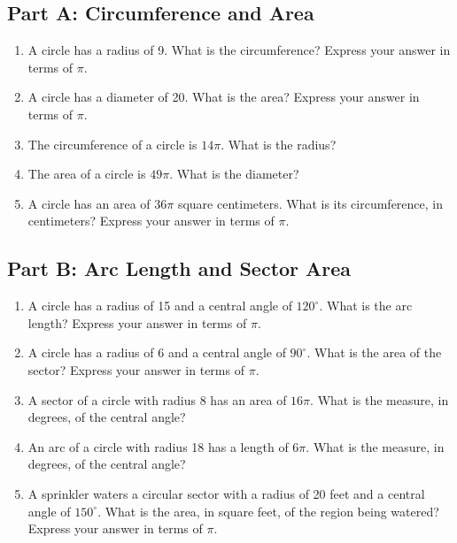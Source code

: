 \documentclass[14pt]{extarticle}
\begin{document}
\subsection*{Part A: Circumference and Area}
\begin{enumerate}
  \item A circle has a radius of 9. What is the circumference? Express your answer in terms of \(\pi\).
  \item A circle has a diameter of 20. What is the area? Express your answer in terms of \(\pi\).
  \item The circumference of a circle is \(14\pi\). What is the radius?
  \item The area of a circle is \(49\pi\). What is the diameter?
  \item A circle has an area of \(36\pi\) square centimeters. What is its circumference, in centimeters? Express your answer in terms of \(\pi\).
\end{enumerate}

\subsection*{Part B: Arc Length and Sector Area}
\begin{enumerate}
  \item A circle has a radius of 15 and a central angle of \(120^\circ\). What is the arc length? Express your answer in terms of \(\pi\).
  \item A circle has a radius of 6 and a central angle of \(90^\circ\). What is the area of the sector? Express your answer in terms of \(\pi\).
  \item A sector of a circle with radius 8 has an area of \(16\pi\). What is the measure, in degrees, of the central angle?
  \item An arc of a circle with radius 18 has a length of \(6\pi\). What is the measure, in degrees, of the central angle?
  \item A sprinkler waters a circular sector with a radius of 20 feet and a central angle of \(150^\circ\). What is the area, in square feet, of the region being watered? Express your answer in terms of \(\pi\).
\end{enumerate}
\end{document}
